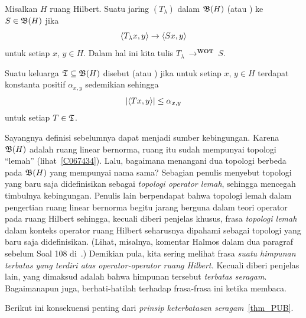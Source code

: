 \begin{defn} Misalkan $H$ ruang Hilbert. Suatu jaring $(T_\lambda)$ dalam $\mathfrak{B}(H)$
 (atau ) ke $S \in \mathfrak{B}(H)$ jika
  \[ \langle T_\lambda x,y \rangle \rightarrow \langle Sx,y \rangle \]
untuk setiap $x$, $y \in H$. Dalam hal ini kita tulis
$T_\lambda~\to^{\textbf{WOT}}~S$.

Suatu keluarga $\mathfrak{T} \subseteq \mathfrak{B}(H)$ disebut
 (atau ) jika untuk setiap $x$, $y \in H$
terdapat konstanta positif $\alpha_{x,y}$ sedemikian sehingga
  \[\lvert\langle Tx,y \rangle\rvert \le \alpha_{x,y}\]
untuk setiap $T \in \mathfrak{T}$.
\end{defn}

Sayangnya definisi sebelumnya dapat menjadi sumber kebingungan. Karena $\mathfrak{B}(H)$ adalah
ruang linear bernorma, ruang itu sudah mempunyai topologi ``lemah'' (lihat~\ref{C067434}). Lalu, bagaimana menangani dua
topologi berbeda pada $\mathfrak{B}(H)$ yang mempunyai nama sama? Sebagian penulis menyebut topologi yang baru saja didefinisikan sebagai
\emph{topologi operator lemah}, sehingga mencegah timbulnya kebingungan. Penulis lain berpendapat bahwa
topologi lemah dalam pengertian ruang linear bernorma begitu jarang berguna dalam teori operator pada ruang Hilbert
sehingga, kecuali diberi penjelas khusus, frasa \emph{topologi lemah} dalam konteks operator ruang Hilbert
seharusnya dipahami sebagai topologi yang baru saja didefinisikan. (Lihat, misalnya, komentar Halmos dalam dua
paragraf sebelum Soal 108 di~\cite{Halmos:1982}.) Demikian pula, kita sering melihat frasa \emph{suatu
himpunan terbatas yang terdiri atas operator-operator ruang Hilbert.} Kecuali diberi penjelas lain, yang dimaksud adalah bahwa himpunan
tersebut \emph{terbatas seragam}. Bagaimanapun juga, berhati-hatilah terhadap frasa-frasa ini ketika membaca.

Berikut ini konsekuensi penting dari \emph{prinsip keterbatasan seragam}~\ref{thm_PUB}.

